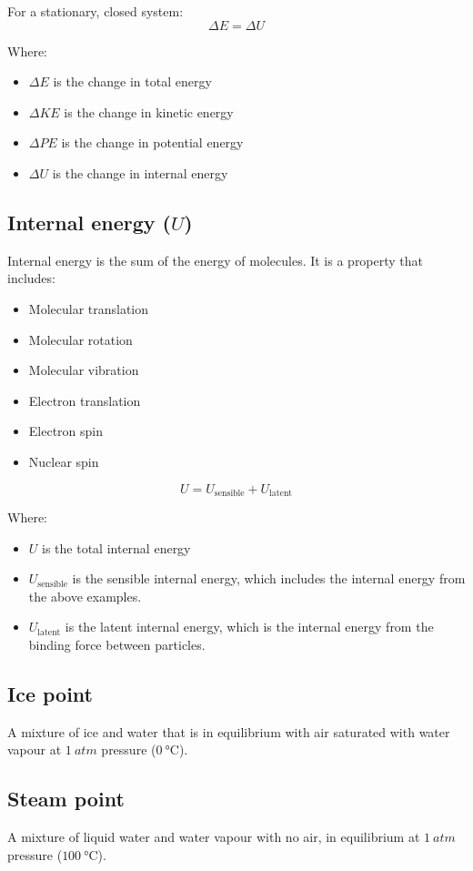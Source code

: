 \documentclass[11pt]{article}
\begin{document}
For a stationary, closed system:
\[\Delta E = \Delta U\]

Where:
\begin{itemize}
\item \(\Delta E\) is the change in total energy
\item \(\Delta KE\) is the change in kinetic energy
\item \(\Delta PE\) is the change in potential energy
\item \(\Delta U\) is the change in internal energy
\end{itemize}

\subsection{Internal energy (\(U\))}
\label{sec:org62d1508}
Internal energy is the sum of the energy of molecules. It is a property that includes:
\begin{itemize}
\item Molecular translation
\item Molecular rotation
\item Molecular vibration
\item Electron translation
\item Electron spin
\item Nuclear spin
\end{itemize}

\[U = U_{\text{sensible}} + U_{\text{latent}}\]

Where:
\begin{itemize}
\item \(U\) is the total internal energy
\item \(U_{\text{sensible}}\) is the sensible internal energy, which includes the internal energy from the above examples.
\item \(U_{\text{latent}}\) is the latent internal energy, which is the internal energy from the binding force between particles.
\end{itemize}

\subsection{Ice point}
\label{sec:org96abdc3}
A mixture of ice and water that is in equilibrium with air saturated with water vapour at \(\qty{1}{atm}\) pressure (\(\qty{0}{\degreeCelsius}\)).

\subsection{Steam point}
\label{sec:orgd210740}
A mixture of liquid water and water vapour with no air, in equilibrium at \(\qty{1}{atm}\) pressure (\(\qty{100}{\degreeCelsius}\)).
\end{document}
